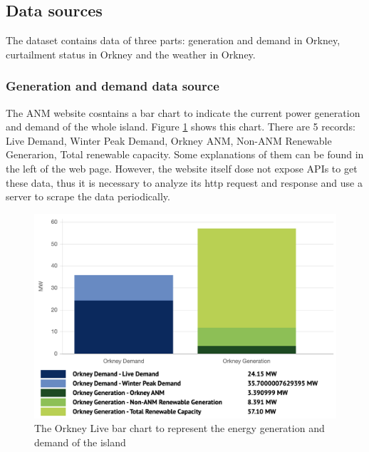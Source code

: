 \documentclass[12pt,a4paper]{report}
\begin{document}
        \subsection{Data sources}
        The dataset contains data of three parts: generation and demand in Orkney, curtailment status in Orkney and the weather in Orkney.

            \subsubsection{Generation and demand data source}
            \label{text_generation_and_demand_data_source}
                The ANM website \cite{website:ANM} cosntains a bar chart to indicate the current power generation and demand of the whole
                island. Figure \ref{fig_anm_barchart} shows this chart. There are 5 records: Live Demand, Winter Peak Demand, Orkney ANM, Non-ANM Renewable Generarion, Total renewable capacity.
                Some explanations of them can be found in the left of the web page.
                However, the website itself dose not expose APIs to get these data, thus it is necessary to analyze its http request and response and use a 
                server to scrape the data periodically.

                \begin{figure}[ht]
                    \centerline{\includegraphics[scale=1]{anm_barchart}}
                    \caption{The Orkney Live bar chart to represent the energy generation and demand of the island}
                    \label{fig_anm_barchart}
                \end{figure}
            
\end{document}
